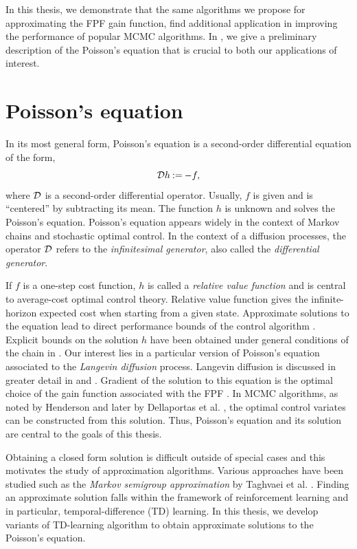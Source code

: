 In this thesis, we demonstrate that the same algorithms we propose for approximating the FPF gain function, find additional application in improving the performance of popular MCMC algorithms. In , we give a preliminary description of the Poisson's equation that is crucial to both our applications of interest.

\section{Poisson's equation} 
\label{poissons_eq}
In its most general form, Poisson's equation is a second-order differential equation of the form,
\begin{equation*}
{\cal D} h \mathbin{:=} - f,
\end{equation*}
where ${\cal D}$ is a second-order differential operator. Usually, $f$ is given and is ``centered'' by subtracting its mean. The function $h$ is unknown and solves the Poisson's equation. Poisson's equation appears widely in the context of Markov chains and stochastic optimal control. In the context of a diffusion processes, the operator ${\cal D}$ refers to the \textit{infinitesimal generator}, also called the \textit{differential generator}. 

If $f$ is a one-step cost function, $h$ is called a \textit{relative value function} and is central to average-cost optimal control theory.  Relative value function gives the infinite-horizon expected cost when starting from a given state. Approximate solutions to the equation lead to direct performance bounds of the control algorithm \cite{ctcn}. Explicit bounds on the solution $h$ have been obtained under general conditions of the chain in \cite{}.
Our interest lies in a particular version of Poisson's equation associated to the \textit{Langevin diffusion} process. Langevin diffusion is discussed in greater detail in  and . Gradient of the solution to this equation is the optimal choice of the gain function associated with the FPF \cite{yanmehmey13}. In MCMC algorithms, as noted by Henderson \cite{henthesis97} and later by Dellaportas et al. \cite{delkon12}, the optimal control variates can be constructed from this solution. Thus, Poisson's equation and its solution are central to the goals of this thesis. 

Obtaining a closed form solution is difficult outside of special cases and this motivates the study of approximation algorithms. Various approaches have been studied such as the \textit{Markov semigroup approximation} by Taghvaei et al. \cite{tagmeh16a}. Finding an approximate solution falls within the framework of reinforcement learning and in particular, temporal-difference (TD) learning. In this thesis, we develop variants of TD-learning algorithm to obtain approximate solutions to the Poisson's equation.

